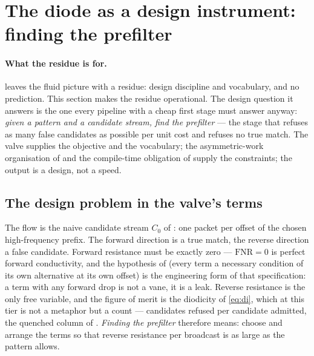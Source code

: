 \documentclass[11pt,letterpaper]{article}
\begin{document}
\section{The diode as a design instrument: finding the prefilter}
\label{sec:calculus}
\paragraph{What the residue is for.}
 leaves the fluid picture with a residue: design
discipline and vocabulary, and no prediction. This section makes the
residue operational. The design question it answers is the one every
pipeline with a cheap first stage must answer anyway: \emph{given a
pattern and a candidate stream, find the prefilter} --- the stage that
refuses as many false candidates as possible per unit cost and refuses no
true match. The valve supplies the objective and the vocabulary; the
asymmetric-work organisation of  and the compile-time
obligation of  supply the constraints; the output is a
design, not a speed.

\subsection{The design problem in the valve's terms}
\label{sec:calculus:terms}
The flow is the naive candidate stream $C_0$ of : one
packet per offset of the chosen high-frequency prefix. The forward
direction is a true match, the reverse direction a false candidate.
Forward resistance must be exactly zero --- $\mathrm{FNR}=0$ is perfect
forward conductivity, and the hypothesis of  (every term a
necessary condition of its own alternative at its own offset) is the
engineering form of that specification: a term with any forward drop is
not a vane, it is a leak. Reverse resistance is the only free variable,
and the figure of merit is the diodicity of \eqref{eq:di}, which at this
tier is not a metaphor but a count --- candidates refused per candidate
admitted, the quenched column of . \emph{Finding the
prefilter} therefore means: choose and arrange the terms so that reverse
resistance per broadcast is as large as the pattern allows.
\end{document}
